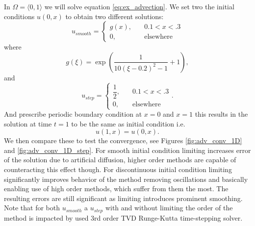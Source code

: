 \begin{example}[Advection 1D]
\label{ex:adv1D}
In $\Omega = \langle 0, 1 \rangle$ we will solve equation \eqref{eq:ex_advection}.
We set two the initial conditions $u(0, x)$ to obtain two different solutions:
\begin{equation}
u_{smooth} = \begin{cases}
g(x),\quad &0.1 < x < .3\\
0, \quad &\text{elsewhere}
\end{cases}
\end{equation}
where
\begin{equation}
g(\xi) = \exp\left(\frac{1}{10(\xi - 0.2)^2 - 1}+ 1\right),
\end{equation}
and
\begin{equation}
u_{step} = \begin{cases}
\dfrac{1}{2},\quad &0.1 < x < .3\\
0, \quad &\text{elsewhere}
\end{cases}.
\end{equation}
And prescribe periodic boundary condition at $x = 0 $ and $x = 1$  this 
results in the solution at time $t = 1$ to be the same as initial condition 
i.e.
\begin{equation}
u(1, x) = u(0, x).
\end{equation} 
We then compare these to test the convergence, see Figures 
\ref{fig:adv_conv_1D} and \ref{fig:adv_conv_1D_step}. For smooth initial condition 
limiting increases error of the solution due to artificial diffusion, higher order 
methods are capable of counteracting this effect though. For discontinuous initial 
condition limiting significantly improves behavior of the method removing oscillations 
and basically enabling use of high order methods, which suffer from them the most. The 
resulting errors are still significant as limiting introduces prominent 
smoothing. Note that for both $u_{smooth}$ a $u_{step}$ with and without limiting the 
order of the method is impacted by used 3rd order TVD Runge-Kutta time-stepping solver.
\end{example}

